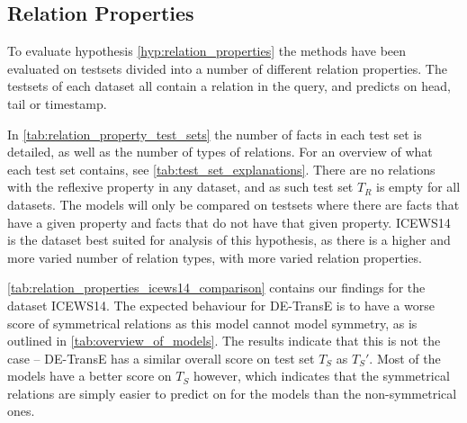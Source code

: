\subsection{Relation Properties}
\label{sec:relation_properties_experiment}







To evaluate hypothesis \autoref{hyp:relation_properties} the methods have been evaluated on testsets divided into a number of different relation properties. The testsets of each dataset all contain a relation in the query, and predicts on head, tail or timestamp.

In \autoref{tab:relation_property_test_sets} the number of facts in each test set is detailed, as well as the number of types of relations.
For an overview of what each test set contains, see \autoref{tab:test_set_explanations}. There are no relations with the reflexive property in any dataset, and as such test set $T_R$ is empty for all datasets.
The models will only be compared on testsets where there are facts that have a given property and facts that do not have that given property. ICEWS14 is the dataset best suited for analysis of this hypothesis, as there is a higher and more varied number of relation types, with more varied relation properties.

\autoref{tab:relation_properties_icews14_comparison} contains our findings for the dataset ICEWS14. The expected behaviour for DE-TransE is to have a worse score of symmetrical relations as this model cannot model symmetry, as is outlined in \autoref{tab:overview_of_models}. The results indicate that this is not the case -- DE-TransE has a similar overall score on test set $T_S$ as $T_S'$. Most of the models have a better score on $T_S$ however, which indicates that the symmetrical relations are simply easier to predict on for the models than the non-symmetrical ones.

